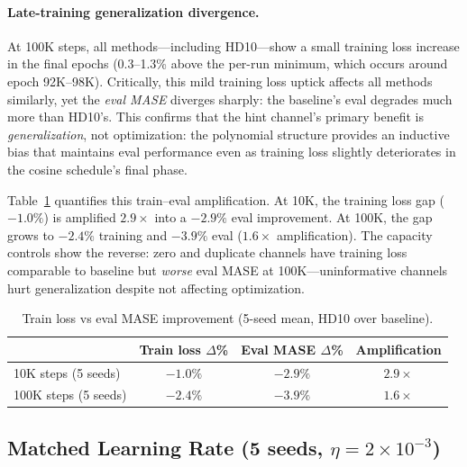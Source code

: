 \documentclass[11pt]{article}
\begin{document}
\paragraph{Late-training generalization divergence.} At 100K steps, all methods---including HD10---show a small training loss increase in the final epochs (0.3--1.3\% above the per-run minimum, which occurs around epoch 92K--98K). Critically, this mild training loss uptick affects all methods similarly, yet the \emph{eval MASE} diverges sharply: the baseline's eval degrades much more than HD10's. This confirms that the hint channel's primary benefit is \emph{generalization}, not optimization: the polynomial structure provides an inductive bias that maintains eval performance even as training loss slightly deteriorates in the cosine schedule's final phase.

Table~\ref{tab:traineval_gap} quantifies this train--eval amplification. At 10K, the training loss gap ($-1.0\%$) is amplified $2.9\times$ into a $-2.9\%$ eval improvement. At 100K, the gap grows to $-2.4\%$ training and $-3.9\%$ eval ($1.6\times$ amplification). The capacity controls show the reverse: zero and duplicate channels have training loss comparable to baseline but \emph{worse} eval MASE at 100K---uninformative channels hurt generalization despite not affecting optimization.

\begin{table}[h]
\centering
\caption{Train loss vs eval MASE improvement (5-seed mean, HD10 over baseline).}
\label{tab:traineval_gap}
\small
\begin{tabular}{lccc}
\toprule
& \textbf{Train loss $\Delta$\%} & \textbf{Eval MASE $\Delta$\%} & \textbf{Amplification} \\
\midrule
10K steps (5 seeds) & $-1.0\%$ & $-2.9\%$ & $2.9\times$ \\
100K steps (5 seeds) & $-2.4\%$ & $-3.9\%$ & $1.6\times$ \\
\bottomrule
\end{tabular}
\end{table}

\subsection{Matched Learning Rate (5 seeds, $\eta = 2 \times 10^{-3}$)}
\end{document}
